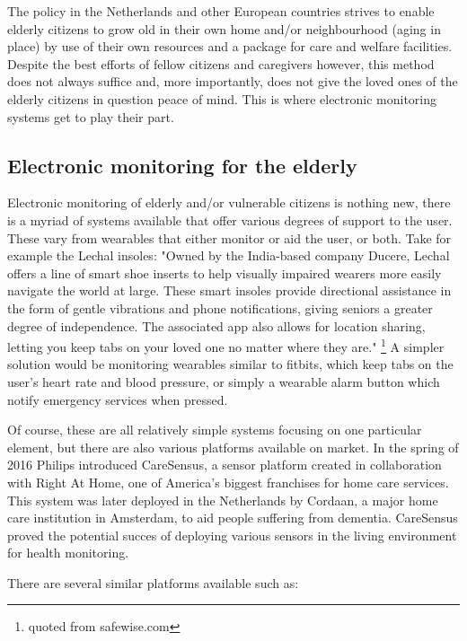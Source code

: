 \documentclass{below-ext}
\begin{document}
The policy in the Netherlands and other European countries strives to enable elderly citizens to grow old in their own home and/or neighbourhood (aging in place) by use of their own resources and a package for care and welfare facilities. \cite{thomas_blanchard} Despite the best efforts of fellow citizens and caregivers however, this method does not always suffice and, more importantly, does not give the loved ones of the elderly citizens in question peace of mind. This is where electronic monitoring systems get to play their part.


\subsection{Electronic monitoring for the elderly}
Electronic monitoring of elderly and/or vulnerable citizens is nothing new, there is a myriad of systems available that offer various degrees of support to the user. These vary from wearables that either monitor or aid the user, or both. Take for example the Lechal insoles: "Owned by the India-based company Ducere, Lechal offers a line of smart shoe inserts to help visually impaired wearers more easily navigate the world at large. These smart insoles provide directional assistance in the form of gentle vibrations and phone notifications, giving seniors a greater degree of independence. The associated app also allows for location sharing, letting you keep tabs on your loved one no matter where they are." \footnote{quoted from safewise.com} A simpler solution would be monitoring wearables similar to fitbits, which keep tabs on the user's heart rate and blood pressure, or simply a wearable alarm button which notify emergency services when pressed.

Of course, these are all relatively simple systems focusing on one particular element, but there are also various platforms available on market. In the spring of 2016 Philips introduced CareSensus, a sensor platform created in collaboration with Right At Home, one of America's biggest franchises for  home care services. This system was later deployed in the Netherlands by Cordaan, a major home care institution in Amsterdam, to aid people suffering from dementia. CareSensus proved the potential succes of deploying various sensors in the living environment for health monitoring.

There are several similar platforms available such as:
\end{document}
